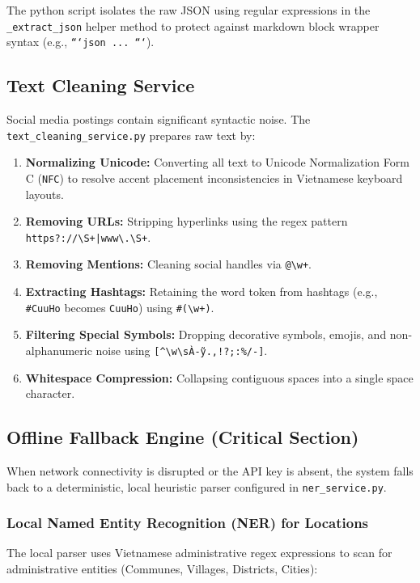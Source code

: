 \documentclass[12pt,a4paper]{article}
\begin{document}
The python script isolates the raw JSON using regular expressions in the \texttt{\_extract\_json} helper method to protect against markdown block wrapper syntax (e.g., \texttt{```json ... ```}).

\subsection{Text Cleaning Service}
Social media postings contain significant syntactic noise. The \texttt{text\_cleaning\_service.py} prepares raw text by:
\begin{enumerate}
    \item \textbf{Normalizing Unicode:} Converting all text to Unicode Normalization Form C (\texttt{NFC}) to resolve accent placement inconsistencies in Vietnamese keyboard layouts.
    \item \textbf{Removing URLs:} Stripping hyperlinks using the regex pattern \texttt{https?://\textbackslash{}S+|www\textbackslash{}.\textbackslash{}S+}.
    \item \textbf{Removing Mentions:} Cleaning social handles via \texttt{@\textbackslash{}w+}.
    \item \textbf{Extracting Hashtags:} Retaining the word token from hashtags (e.g., \texttt{\#CuuHo} becomes \texttt{CuuHo}) using \texttt{\#(\textbackslash{}w+)}.
    \item \textbf{Filtering Special Symbols:} Dropping decorative symbols, emojis, and non-alphanumeric noise using \texttt{[\^{}\textbackslash{}w\textbackslash{}sÀ-ỹ.,!?;:\%/-]}.
    \item \textbf{Whitespace Compression:} Collapsing contiguous spaces into a single space character.
\end{enumerate}

\subsection{Offline Fallback Engine (Critical Section)}
When network connectivity is disrupted or the API key is absent, the system falls back to a deterministic, local heuristic parser configured in \texttt{ner\_service.py}.

\subsubsection{Local Named Entity Recognition (NER) for Locations}
The local parser uses Vietnamese administrative regex expressions to scan for administrative entities (Communes, Villages, Districts, Cities):
\end{document}
